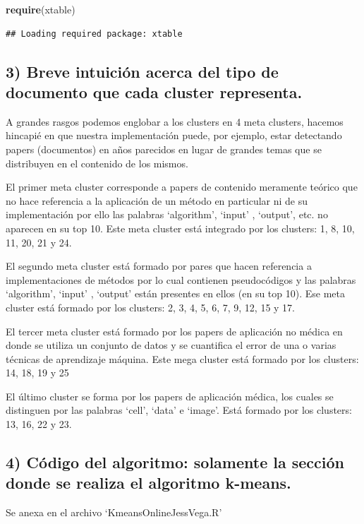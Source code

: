 \documentclass[
]{article}
\newenvironment{Shaded}{\begin{snugshade}}{\end{snugshade}}
\newcommand{\KeywordTok}[1]{\textcolor[rgb]{0.13,0.29,0.53}{\textbf{#1}}}
\newcommand{\NormalTok}[1]{#1}
\begin{document}
\begin{Shaded}
\begin{Highlighting}[]
\KeywordTok{require}\NormalTok{(xtable)}
\end{Highlighting}
\end{Shaded}

\begin{verbatim}
## Loading required package: xtable
\end{verbatim}

\hypertarget{breve-intuiciuxf3n-acerca-del-tipo-de-documento-que-cada-cluster-representa.}{%
\subsection{3) Breve intuición acerca del tipo de documento que cada
cluster
representa.}\label{breve-intuiciuxf3n-acerca-del-tipo-de-documento-que-cada-cluster-representa.}}

A grandes rasgos podemos englobar a los clusters en 4 meta clusters,
hacemos hincapié en que nuestra implementación puede, por ejemplo, estar
detectando papers (documentos) en años parecidos en lugar de grandes
temas que se distribuyen en el contenido de los mismos.

El primer meta cluster corresponde a papers de contenido meramente
teórico que no hace referencia a la aplicación de un método en
particular ni de su implementación por ello las palabras `algorithm',
`input' , `output', etc. no aparecen en su top 10. Este meta cluster
está integrado por los clusters: 1, 8, 10, 11, 20, 21 y 24.

El segundo meta cluster está formado por pares que hacen referencia a
implementaciones de métodos por lo cual contienen pseudocódigos y las
palabras `algorithm', `input' , `output' están presentes en ellos (en su
top 10). Ese meta cluster está formado por los clusters: 2, 3, 4, 5, 6,
7, 9, 12, 15 y 17.

El tercer meta cluster está formado por los papers de aplicación no
médica en donde se utiliza un conjunto de datos y se cuantifica el error
de una o varias técnicas de aprendizaje máquina. Este mega cluster está
formado por los clusters: 14, 18, 19 y 25

El último cluster se forma por los papers de aplicación médica, los
cuales se distinguen por las palabras `cell', `data' e `image'. Está
formado por los clusters: 13, 16, 22 y 23.

\hypertarget{cuxf3digo-del-algoritmo-solamente-la-secciuxf3n-donde-se-realiza-el-algoritmo-k-means.}{%
\subsection{4) Código del algoritmo: solamente la sección donde se
realiza el algoritmo
k-means.}\label{cuxf3digo-del-algoritmo-solamente-la-secciuxf3n-donde-se-realiza-el-algoritmo-k-means.}}

Se anexa en el archivo `KmeansOnlineJessVega.R'
\end{document}
